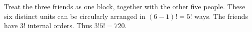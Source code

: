 Treat the three friends as one block, together with the other five people. These six distinct units can be circularly arranged in $(6-1)!=5!$ ways. The friends have $3!$ internal orders. Thus $3!5!=\boxed{720}$.
